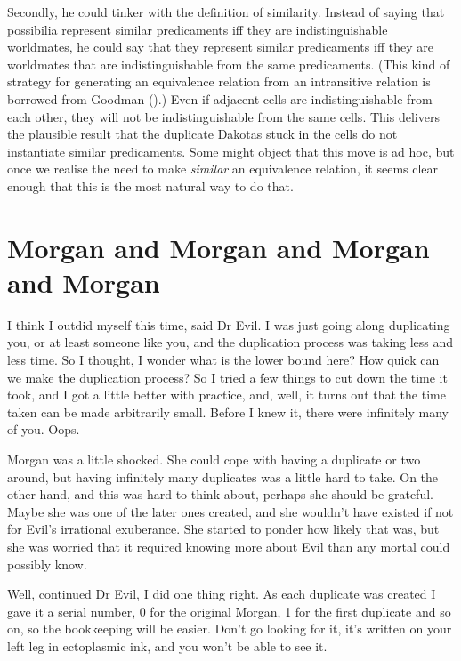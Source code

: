 \documentclass[
  11pt,
  letterpaper,
  DIV=11,
  numbers=noendperiod,
  twoside]{scrartcl}
\begin{document}
Secondly, he could tinker with the definition of similarity. Instead of
saying that possibilia represent similar predicaments iff they are
indistinguishable worldmates, he could say that they represent similar
predicaments iff they are worldmates that are indistinguishable from the
same predicaments. (This kind of strategy for generating an equivalence
relation from an intransitive relation is borrowed from Goodman
().) Even if adjacent cells are
indistinguishable from each other, they will not be indistinguishable
from the same cells. This delivers the plausible result that the
duplicate Dakotas stuck in the cells do not instantiate similar
predicaments. Some might object that this move is ad hoc, but once we
realise the need to make \emph{similar} an equivalence relation, it
seems clear enough that this is the most natural way to do that.

\section{Morgan and Morgan and Morgan and
Morgan}\label{morgan-and-morgan-and-morgan-and-morgan}

I think I outdid myself this time, said Dr Evil. I was just going along
duplicating you, or at least someone like you, and the duplication
process was taking less and less time. So I thought, I wonder what is
the lower bound here? How quick can we make the duplication process? So
I tried a few things to cut down the time it took, and I got a little
better with practice, and, well, it turns out that the time taken can be
made arbitrarily small. Before I knew it, there were infinitely many of
you. Oops.

Morgan was a little shocked. She could cope with having a duplicate or
two around, but having infinitely many duplicates was a little hard to
take. On the other hand, and this was hard to think about, perhaps she
should be grateful. Maybe she was one of the later ones created, and she
wouldn't have existed if not for Evil's irrational exuberance. She
started to ponder how likely that was, but she was worried that it
required knowing more about Evil than any mortal could possibly know.

Well, continued Dr Evil, I did one thing right. As each duplicate was
created I gave it a serial number, 0 for the original Morgan, 1 for the
first duplicate and so on, so the bookkeeping will be easier. Don't go
looking for it, it's written on your left leg in ectoplasmic ink, and
you won't be able to see it.
\end{document}
